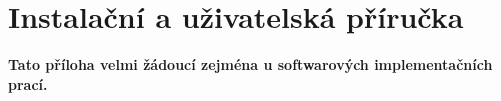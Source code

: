 \chapter{Instalační a uživatelská příručka}
\textbf{\large Tato příloha velmi žádoucí zejména u softwarových implementačních prací.}